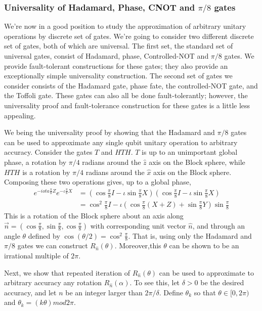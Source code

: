 \subsubsection{Universality of Hadamard, Phase, CNOT and $\pi/8$ gates}
We're now in a good position to study the approximation of arbitrary unitary operations by discrete set of gates. We're going to consider two different discrete set of gates, both of which are universal. The first set, the standard set of universal gates, consist of Hadamard, phase, Controlled-NOT and $\pi/8$ gates. We provide fault-tolerant constructions for these gates; they also provide an exceptionally simple universality construction. The second set of gates we consider consists of the Hadamard gate, phase fate, the controlled-NOT gate, and the Toffoli gate. These gates can also all be done fault-tolerantly; however, the universality proof and fault-tolerance construction for these gates is a little less appealing.

We being the universality proof by showing that the Hadamard and $\pi/8$ gates can be used to approximate any single qubit unitary operation to arbitrary accuracy. Consider the gates $T$ and $HTH$. $T$ is up to an unimportant global phase, a rotation by $\pi/4$ radians around the $\hat{z}$ axis on the Block sphere, while $HTH$ is a rotation by $\pi/4$ radians around the $\hat{x}$ axis on the Block sphere. Composing these two operations gives, up to a global phase,
\begin{align*}
e^{-iota \frac{\pi}{8}Z}e^{-\iota \frac{\pi}{8}X} &= \left(\cos\frac{\pi}{8}I-\iota\sin\frac{\pi}{8}X\right)\left(\cos\frac{\pi}{8}I-\iota\sin \frac{\pi}{8}X\right)\\
&=\cos^2\frac{\pi}{8}I-\iota \left(\cos\frac{\pi}{8}(X+Z)+\sin\frac{\pi}{8}Y\right)\sin\frac{\pi}{8}
\end{align*}
This is a rotation of the Block sphere about an axis along $\vec{n}=(\cos \frac{\pi}{8},\sin\frac{\pi}{8},\cos\frac{\pi}{8})$ with corresponding unit vector $\hat{n}$, and through an angle $\theta$ defined by $\cos(\theta/2)=\cos^2\frac{\pi}{8}$. That is, using only the Hadamard and $\pi/8$ gates we can construct $R_{\hat{n}}(\theta)$. Moreover,this $\theta$ can be shown to be an irrational multiple of $2\pi$.

Next, we show that repeated iteration of $R_{\hat{n}}(\theta)$ can be used to approximate to arbitrary accuracy any rotation $R_{\hat{n}}(\alpha)$. To see this, let $\delta >0$ be the desired accuracy, and let $n$ be an integer larger than $2\pi/\delta$. Define $\theta_k$ so that $\theta \in [0,2\pi)$ and $\theta_k=(k\theta)mod 2\pi$.

